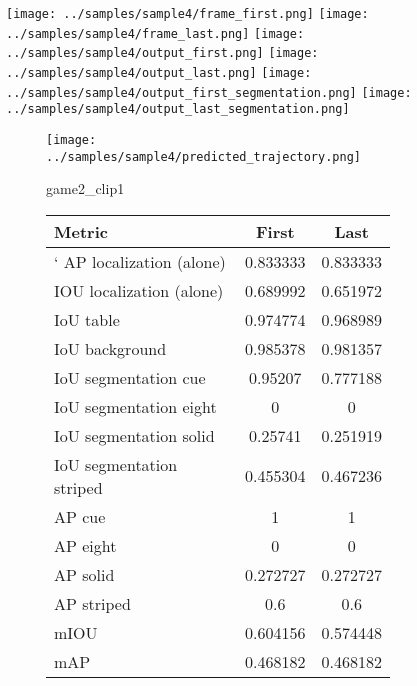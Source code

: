 \begin{figure}
    \texttt{[image: ../samples/sample4/frame\_first.png]}
    \texttt{[image: ../samples/sample4/frame\_last.png]}
    \newline
    \texttt{[image: ../samples/sample4/output\_first.png]}
    \texttt{[image: ../samples/sample4/output\_last.png]}
    \newline
    \texttt{[image: ../samples/sample4/output\_first\_segmentation.png]}
    \texttt{[image: ../samples/sample4/output\_last\_segmentation.png]}
    \newline
    \begin{subfigure}[b]{0.49\textwidth}
        \vspace{20pt}
        \texttt{[image: ../samples/sample4/predicted\_trajectory.png]}
        \caption*{game2\_clip1}
    \end{subfigure}
\begin{subfigure}[b]{0.49\textwidth}
    \begin{tabular}{|l|c|c|}
        \hline
        \textbf{Metric} & \textbf{First} & \textbf{Last} \\
        \hline
    `    AP localization (alone) & 0.833333 & 0.833333 \\ 
        IOU localization (alone) & 0.689992 & 0.651972 \\ 
        \hline
        IoU table & 0.974774 & 0.968989 \\ 
        IoU background & 0.985378 & 0.981357 \\ 
        \hline
        IoU segmentation cue & 0.95207 & 0.777188 \\ 
        IoU segmentation eight & 0 & 0 \\ 
        IoU segmentation solid & 0.25741 & 0.251919 \\ 
        IoU segmentation striped & 0.455304 & 0.467236 \\ 
        \hline
        AP cue & 1 & 1 \\ 
        AP eight & 0 & 0 \\ 
        AP solid & 0.272727 & 0.272727 \\ 
        AP striped & 0.6 & 0.6 \\ 
        \hline
        mIOU & 0.604156 & 0.574448 \\ 
        mAP & 0.468182 & 0.468182 \\ 
        \hline
    \end{tabular} 
\end{subfigure}
\end{figure}


